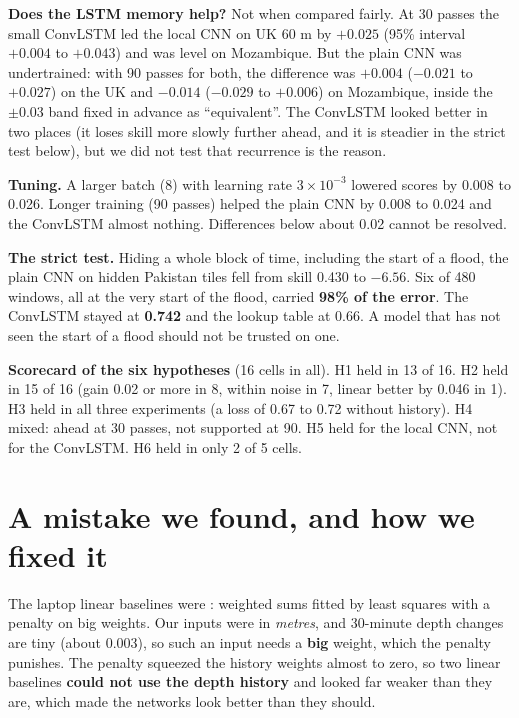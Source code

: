 \textbf{Does the LSTM memory help?} Not when compared fairly. At 30 passes the small ConvLSTM led the local CNN on UK 60 m by $+0.025$ (95\% interval $+0.004$ to $+0.043$) and was level on Mozambique. But the plain CNN was undertrained: with 90 passes for both, the difference was $+0.004$ ($-0.021$ to $+0.027$) on the UK and $-0.014$ ($-0.029$ to $+0.006$) on Mozambique, inside the $\pm0.03$ band fixed in advance as ``equivalent''. The ConvLSTM looked better in two places (it loses skill more slowly further ahead, and it is steadier in the strict test below), but we did not test that recurrence is the reason.


\textbf{Tuning.} A larger batch (8) with learning rate $3\times10^{-3}$ lowered scores by 0.008 to 0.026. Longer training (90 passes) helped the plain CNN by 0.008 to 0.024 and the ConvLSTM almost nothing. Differences below about 0.02 cannot be resolved.

\textbf{The strict test.} Hiding a whole block of time, including the start of a flood, the plain CNN on hidden Pakistan tiles fell from skill 0.430 to \textbf{$-6.56$}. Six of 480 windows, all at the very start of the flood, carried \textbf{98\% of the error}. The ConvLSTM stayed at \textbf{0.742} and the lookup table at 0.66. A model that has not seen the start of a flood should not be trusted on one.

\textbf{Scorecard of the six hypotheses} (16 cells in all). H1 held in 13 of 16. H2 held in 15 of 16 (gain 0.02 or more in 8, within noise in 7, linear better by 0.046 in 1). H3 held in all three experiments (a loss of 0.67 to 0.72 without history). H4 mixed: ahead at 30 passes, not supported at 90. H5 held for the local CNN, not for the ConvLSTM. H6 held in only 2 of 5 cells.

\section{A mistake we found, and how we fixed it}\label{ch:bug}

The laptop linear baselines were : weighted sums fitted by least squares with a penalty on big weights. Our inputs were in \emph{metres}, and 30-minute depth changes are tiny (about 0.003), so such an input needs a \textbf{big} weight, which the penalty punishes. The penalty squeezed the history weights almost to zero, so two linear baselines \textbf{could not use the depth history} and looked far weaker than they are, which made the networks look better than they should.

